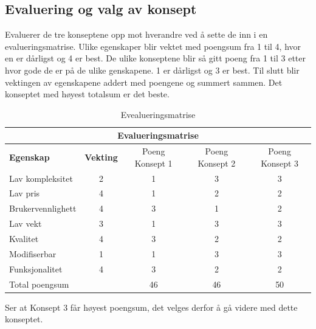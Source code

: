 \subsection{Evaluering og valg av konsept}
Evaluerer de tre konseptene opp mot hverandre ved å sette de inn i en evalueringsmatrise. Ulike egenskaper blir vektet med poengsum fra 1 til 4, hvor en er dårligst og 4 er best. De ulike konseptene blir så gitt poeng fra 1 til 3 etter hvor gode de er på de ulike genskapene. 1 er dårligst og 3 er best. Til slutt blir vektingen av egenskapene addert med poengene og summert sammen. Det konseptet med høyest totalsum er det beste.

\begin{table}[H]
\begin{center}
\begin{tabular}{| l | c |c | c | c |}
\hline
\multicolumn{5}{|c|}{Evalueringsmatrise} \\
\hline
\textbf{Egenskap} & \textbf{Vekting} & Poeng Konsept 1 & Poeng Konsept 2 & Poeng Konsept 3\\
\hline
Lav kompleksitet & 2 & 1 & 3 & 3\\
\hline
Lav pris &4 & 1 & 2 & 2\\
\hline
Brukervennlighett & 4 & 3 & 1 & 2\\
\hline
Lav vekt & 3 & 1 & 3 & 3\\
\hline
Kvalitet & 4 & 3 & 2 & 2\\
\hline
Modifiserbar & 1 & 1 & 3 & 3\\
\hline
Funksjonalitet & 4 & 3 & 2 & 2\\
\hline
\multicolumn{2}{|l|}{Total poengsum} & 46 & 46 & 50 \\
\hline
\end{tabular}
\end{center}
\caption{Evealueringsmatrise}
\end{table}

\begin{flushleft}
Ser at Konsept 3 får høyest poengsum, det velges derfor å gå videre med dette konseptet.
\end{flushleft}

